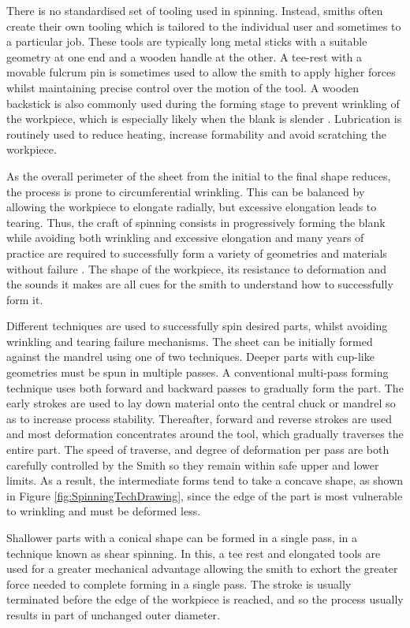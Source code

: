 There is no standardised set of tooling used in spinning. Instead, smiths often create their own tooling which is tailored to the individual user and sometimes to a particular job. These tools are typically long metal sticks with a suitable geometry at one end and a wooden handle at the other. A tee-rest with a movable fulcrum pin is sometimes used to allow the smith to apply higher forces whilst maintaining precise control over the motion of the tool. A wooden backstick is also commonly used during the forming stage to prevent wrinkling of the workpiece, which is especially likely when the blank is slender \citep{Jawale2019AnSpinning}. Lubrication is routinely used to reduce heating, increase formability and avoid scratching the workpiece.

As the overall perimeter of the sheet from the initial to the final shape reduces, the process is prone to circumferential wrinkling. This can be balanced by allowing the workpiece to elongate radially, but excessive elongation leads to tearing. Thus, the craft of spinning consists in progressively forming the blank while avoiding both wrinkling and excessive elongation and many years of practice are required to successfully form a variety of geometries and materials without failure \citep{Holtzappfel1852TurningManipulation,Tuells1912MetalUsed}. The shape of the workpiece, its resistance to deformation and the sounds it makes are all cues for the smith to understand how to successfully form it.

Different techniques are used to successfully spin desired parts, whilst avoiding wrinkling and tearing failure mechanisms. The sheet can be initially formed against the mandrel using one of two techniques. Deeper parts with cup-like geometries must be spun in multiple passes. A conventional multi-pass forming technique uses both forward and backward passes to gradually form the part. The early strokes are used to lay down material onto the central chuck or mandrel so as to increase process stability. Thereafter, forward and reverse strokes are used and most deformation concentrates around the tool, which gradually traverses the entire part. The speed of traverse, and degree of deformation per pass are both carefully controlled by the Smith so they remain within safe upper and lower limits. As a result, the intermediate forms tend to take a concave shape, as shown in Figure \ref{fig:SpinningTechDrawing}, since the edge of the part is most vulnerable to wrinkling and must be deformed less. 

Shallower parts with a conical shape can be formed in a single pass, in a technique known as shear spinning. In this, a tee rest and elongated tools are used for a greater mechanical advantage allowing the smith to exhort the greater force needed to complete forming in a single pass. The stroke is usually terminated before the edge of the workpiece is reached, and so the process usually results in part of unchanged outer diameter. 

